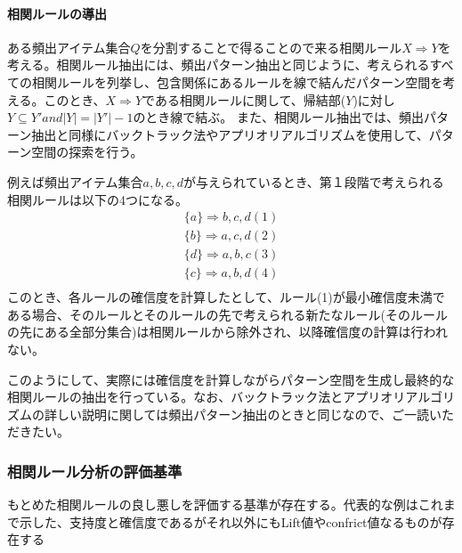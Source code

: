 \documentclass[dvipdfmx]{jsarticle}
\begin{document}
\paragraph{相関ルールの導出}
ある頻出アイテム集合$Q$を分割することで得ることので来る相関ルール$X \Rightarrow Y$を考える。相関ルール抽出には、頻出パターン抽出と同じように、考えられるすべての相関ルールを列挙し、包含関係にあるルールを線で結んだパターン空間を考える。このとき、$X \Rightarrow Y$である相関ルールに関して、帰結部($Y$)に対し$Y\subseteq Y' and |Y| = |Y'|-1$のとき線で結ぶ。
また、相関ルール抽出では、頻出パターン抽出と同様にバックトラック法やアプリオリアルゴリズムを使用して、パターン空間の探索を行う。\par
例えば頻出アイテム集合${a, b, c, d}$が与えられているとき、第１段階で考えられる相関ルールは以下の4つになる。
\begin{gather*}
  \{a\} \Rightarrow {b, c, d} (1)\\
  \{b\} \Rightarrow {a, c, d} (2)\\
  \{d\} \Rightarrow {a, b, c} (3)\\
  \{c\} \Rightarrow {a, b, d} (4)\\
\end{gather*}
このとき、各ルールの確信度を計算したとして、ルール(1)が最小確信度未満である場合、そのルールとそのルールの先で考えられる新たなルール(そのルールの先にある全部分集合)は相関ルールから除外され、以降確信度の計算は行われない。\par
このようにして、実際には確信度を計算しながらパターン空間を生成し最終的な相関ルールの抽出を行っている。なお、バックトラック法とアプリオリアルゴリズムの詳しい説明に関しては頻出パターン抽出のときと同じなので、ご一読いただきたい。
\subsubsection{相関ルール分析の評価基準}
もとめた相関ルールの良し悪しを評価する基準が存在する。代表的な例はこれまで示した、支持度と確信度であるがそれ以外にもLift値やconfrict値なるものが存在する
\end{document}
